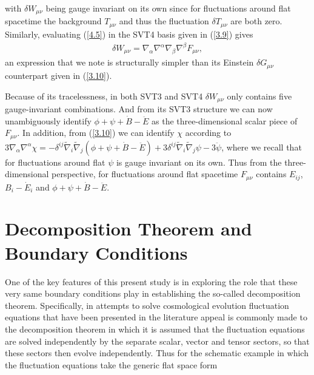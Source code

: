 %
with $\delta W_{\mu\nu}$ being gauge invariant on its own since for fluctuations around flat spacetime the background $T_{\mu\nu}$ and thus the fluctuation $\delta T_{\mu\nu}$ are both zero. Similarly,  evaluating (\ref{4.5}) in the SVT4 basis given in (\ref{3.9}) gives 
%
\begin{eqnarray}
\delta W_{\mu\nu}=\nabla_{\alpha}\nabla^{\alpha}\nabla_{\beta}\nabla^{\beta}F_{\mu\nu},
\label{4.7}
\end{eqnarray}
%
an expression that we note is structurally  simpler than its Einstein $\delta G_{\mu\nu}$ counterpart given  in (\ref{3.10}). 


Because of its tracelessness, in both SVT3 and SVT4 $\delta W_{\mu\nu}$ only contains five gauge-invariant combinations. And from its SVT3 structure we can now unambiguously identify $\phi + \psi +\dot{B}-\ddot{E}$ as the three-dimensional scalar piece of $F_{\mu\nu}$. In addition, from (\ref{3.10}) we can identify $\chi$ according to $3\nabla_{\alpha}\nabla^{\alpha}\chi=-\delta^{ij}\tilde{\nabla}_i\tilde{\nabla}_j(\phi  +\psi +\dot{B}-\ddot{E})+3\delta^{ij}\tilde{\nabla}_{i}\tilde{\nabla}_{j}\psi-3\ddot{\psi}$, where we recall that for fluctuations around flat $\psi$ is gauge invariant on its own. Thus from the three-dimensional perspective, for fluctuations around flat spacetime $F_{\mu\nu}$ contains $E_{ij}$, $B_i-\dot{E}_i$ and $\phi + \psi +\dot{B}-\ddot{E}$. 

\section{Decomposition Theorem and Boundary Conditions}
\label{s:decomposition_theorem}

One of the key features of this present study is in exploring the role that these very same boundary conditions play in establishing the so-called decomposition theorem. Specifically, in attempts to solve cosmological  evolution fluctuation equations that have been presented in the literature appeal is commonly made to the decomposition theorem in which it is assumed that the fluctuation equations are solved independently by the separate scalar, vector and tensor sectors, so that these sectors then evolve independently. Thus for the schematic example in which the fluctuation equations  take the generic flat space form


